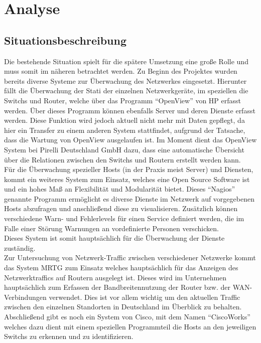 \chapter{Analyse}
\label{cha:analyse}

\section{Situationsbeschreibung}
\label{sec:situation}

Die bestehende Situation spielt für die spätere Umsetzung eine große Rolle und muss somit im näheren betrachtet werden.
Zu Beginn des Projektes wurden bereits diverse Systeme zur Überwachung des Netzwerkes eingesetzt. Hierunter fällt die Überwachung der Stati der einzelnen Netzwerkgeräte, im speziellen die Switchs und Router, welche über das Programm “OpenView” von HP erfasst werden. Über dieses Programm können ebenfalls Server und deren Dienste erfasst werden. Diese Funktion wird jedoch aktuell nicht mehr mit Daten gepflegt, da hier ein Transfer zu einem anderen System stattfindet, aufgrund der Tatsache, dass die Wartung von OpenView ausgelaufen ist. Im Moment dient das OpenView System bei Pirelli Deutschland GmbH dazu, dass eine automatische Übersicht über die Relationen zwischen den Switchs und Routern erstellt werden kann.\\
Für die Überwachung spezieller Hosts (in der Praxis meist Server) und Diensten, kommt ein weiteres System zum Einsatz, welches eine Open Source Software ist und ein hohes Maß an Flexibilität und Modularität bietet. Dieses “Nagios” genannte Programm ermöglicht es diverse Dienste im Netzwerk auf vorgegebenen Hosts abzufragen und anschließend diese zu visualisieren. Zusätzlich können verschiedene Warn- und Fehlerlevels für einen Service definiert werden, die im Falle einer Störung Warnungen an vordefinierte Personen verschicken.\\
Dieses System ist somit hauptsächlich für die Überwachung der Dienste zuständig.\\
Zur Untersuchung von Netzwerk-Traffic zwischen verschiedener Netzwerke kommt das System MRTG zum Einsatz welches hauptsächlich für das Anzeigen des Netzwerktraffics auf Routern ausgelegt ist.
Dieses wird im Unternehmen hauptsächlich zum Erfassen der Bandbreitennutzung der Router bzw. der WAN-Verbindungen verwendet.
Dies ist vor allem wichtig um den aktuellen Traffic zwischen den einzelnen Standorten in Deutschland im Überblick zu behalten.\\
Abschließend gibt es noch ein System von Cisco, mit dem Namen “CiscoWorks” welches dazu dient mit einem speziellen Programmteil die Hosts an den jeweiligen Switchs zu erkennen und zu identifizieren.
